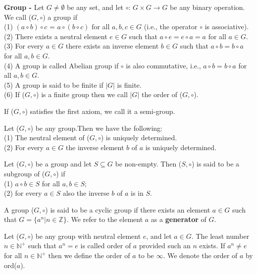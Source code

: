 \documentclass[a4paper]{article}
\begin{document}
\begin{definition}
\textbf{Group -} Let $G \neq \emptyset$ be any set, and let $\circ$: $G \times G \to G$ be any binary operation. We call ($G, \circ$) a group if\\
(1) $(a \circ b) \circ c$ = $a \circ (b \circ c)$ for all $a, b, c \in G$ (i.e., the operator $\circ$ is associative).\\
(2) There exists a neutral element $e \in G$ such that $a \circ e = e \circ a = a$ for all $a \in G$.\\
(3) For every $a \in G$ there exists an inverse element $b \in G$ such that $a \circ b = b \circ a$ for all $a,b \in G$.\\
(4) A group is called Abelian group if $\circ$ is also commutative, i.e., $a \circ b  = b \circ a$ for all $a, b \in G$.\\
(5) A group is said to be finite if $|G|$ is finite.\\
(6) If ($G, \circ$) is a finite group then we call $|G|$ the order of ($G, \circ$).
\end{definition}
If ($G, \circ$) satisfies the first axiom, we call it a semi-group.


\begin{theorem}
Let ($G, \circ$) be any group.Then we have the following:\\
(1) The neutral element of ($G, \circ$) is uniquely determined.\\
(2) For every $a \in G$ the inverse element $b$ of $a$ is uniquely determined.
\end{theorem}


\begin{definition}
Let ($G, \circ$) be a group and let $S \subseteq G$ be non-empty. Then ($S, \circ$) is said to be a subgroup of ($G, \circ$) if\\
(1) $a \circ b \in S$ for all $a, b \in S$;\\
(2) for every $a \in S$ also the inverse $b$ of $a$ is in $S$. 
\end{definition}


\begin{definition}
A group ($G, \circ$) is said to be a cyclic group if there exists an element $a \in G$ such that $G = \{ a^{n} | n \in \mathbb{Z} \}$. We refer to the element $a$ as a \textbf{generator} of $G$.
\end{definition}


\begin{definition}
Let ($G, \circ$) be any group with neutral element $e$, and let $a \in G$. The least number $n \in \mathbb{N}^{+}$ such that $a^{n} = e$ is called order of $a$ provided such an $n$ exists. If $a^{n} \neq e$ for all $n \in \mathbb{N}^{+}$ then we define the order of $a$ to be $\infty$. We denote the order of $a$ by ord($a$).
\end{definition}
\end{document}
